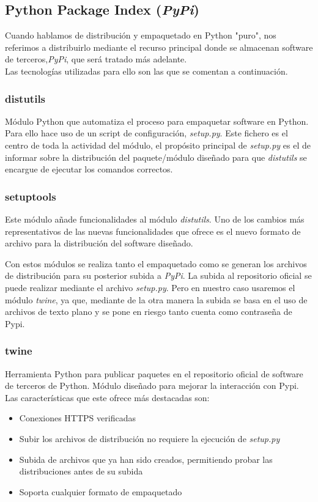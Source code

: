  \subsection*{Python Package Index (\emph{PyPi})}
 Cuando hablamos de distribución y empaquetado en Python "puro", nos referimos a distribuirlo mediante el recurso principal donde se almacenan software de terceros,\emph{PyPi}, que será tratado más adelante. \\
 Las tecnologías utilizadas para ello son las que se comentan a continuación.
 
 \subsubsection*{distutils}
 Módulo Python que automatiza el proceso para empaquetar software en Python. Para ello hace uso de un script de configuración, \emph{setup.py}. Este fichero es el centro de toda la actividad del módulo, el propósito principal de \emph{setup.py} es el de informar sobre la distribución del paquete/módulo diseñado para que \textit{distutils} se encargue de ejecutar los comandos correctos. 
 
 \subsubsection*{setuptools}
 Este módulo añade funcionalidades al módulo \textit{distutils}. Uno de los cambios más representativos de las nuevas funcionalidades que ofrece es el nuevo formato de archivo para la distribución del software diseñado. 
 
 Con estos módulos se realiza tanto el empaquetado como se generan los archivos de distribución para su posterior subida a \emph{PyPi}. La subida al repositorio oficial se puede realizar mediante el archivo \emph{setup.py}. Pero en nuestro caso usaremos el módulo \textit{twine}, ya que, mediante de la otra manera la subida se basa en el uso de archivos de texto plano y se pone en riesgo tanto cuenta como contraseña de Pypi.
 
 \subsubsection*{twine}
 Herramienta Python para publicar paquetes en el repositorio oficial de software de terceros de Python. Módulo diseñado para mejorar la interacción con Pypi. Las características que este ofrece más destacadas son:
 \begin{itemize}
     \item Conexiones HTTPS verificadas
     \item Subir los archivos de distribución no requiere la ejecución de \emph{setup.py}
     \item Subida de archivos que ya han sido creados, permitiendo probar las distribuciones antes de su subida
     \item Soporta cualquier formato de empaquetado
 \end{itemize}
 
